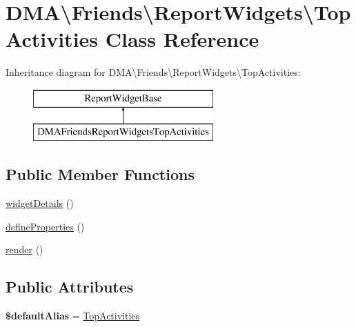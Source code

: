 \hypertarget{classDMA_1_1Friends_1_1ReportWidgets_1_1TopActivities}{}\section{D\+M\+A\textbackslash{}Friends\textbackslash{}Report\+Widgets\textbackslash{}Top\+Activities Class Reference}
\label{classDMA_1_1Friends_1_1ReportWidgets_1_1TopActivities}
Inheritance diagram for D\+M\+A\textbackslash{}Friends\textbackslash{}Report\+Widgets\textbackslash{}Top\+Activities\+:\begin{figure}[H]
\begin{center}
\leavevmode
\includegraphics[height=2.000000cm]{d5/dcb/classDMA_1_1Friends_1_1ReportWidgets_1_1TopActivities}
\end{center}
\end{figure}
\subsection*{Public Member Functions}
\begin{DoxyCompactItemize}
\item 
\hyperlink{classDMA_1_1Friends_1_1ReportWidgets_1_1TopActivities_a204e8b1ecdea15985b11a958e59d5081}{widget\+Details} ()
\item 
\hyperlink{classDMA_1_1Friends_1_1ReportWidgets_1_1TopActivities_a845be283e9d23ec6dfc14a9c26ec044a}{define\+Properties} ()
\item 
\hyperlink{classDMA_1_1Friends_1_1ReportWidgets_1_1TopActivities_a853a2bead38468c9daaedfe55bdffecb}{render} ()
\end{DoxyCompactItemize}
\subsection*{Public Attributes}
\begin{DoxyCompactItemize}
\item 
\hypertarget{classDMA_1_1Friends_1_1ReportWidgets_1_1TopActivities_ac7fc14733142af81776f6b54c8e55918}{}{\bfseries \$default\+Alias} = \textquotesingle{}\hyperlink{classDMA_1_1Friends_1_1ReportWidgets_1_1TopActivities}{Top\+Activities}\textquotesingle{}\label{classDMA_1_1Friends_1_1ReportWidgets_1_1TopActivities_ac7fc14733142af81776f6b54c8e55918}

\end{DoxyCompactItemize}


